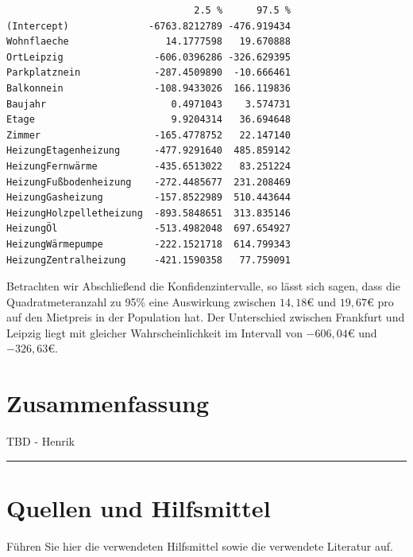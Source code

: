 \documentclass[
  a4paper,
  DIV=11]{scrartcl}
\begin{document}
\begin{verbatim}
                                 2.5 %      97.5 %
(Intercept)              -6763.8212789 -476.919434
Wohnflaeche                 14.1777598   19.670888
OrtLeipzig                -606.0396286 -326.629395
Parkplatznein             -287.4509890  -10.666461
Balkonnein                -108.9433026  166.119836
Baujahr                      0.4971043    3.574731
Etage                        9.9204314   36.694648
Zimmer                    -165.4778752   22.147140
HeizungEtagenheizung      -477.9291640  485.859142
HeizungFernwärme          -435.6513022   83.251224
HeizungFußbodenheizung    -272.4485677  231.208469
HeizungGasheizung         -157.8522989  510.443644
HeizungHolzpelletheizung  -893.5848651  313.835146
HeizungÖl                 -513.4982048  697.654927
HeizungWärmepumpe         -222.1521718  614.799343
HeizungZentralheizung     -421.1590358   77.759091
\end{verbatim}

Betrachten wir Abschließend die Konfidenzintervalle, so lässt sich
sagen, dass die Quadratmeteranzahl zu 95\% eine Auswirkung zwischen
\(14,18€\) und \(19,67€\) pro auf den Mietpreis in der Population hat.
Der Unterschied zwischen Frankfurt und Leipzig liegt mit gleicher
Wahrscheinlichkeit im Intervall von \(-606,04€\) und \(-326,63€\).

\hypertarget{zusammenfassung}{%
\section{Zusammenfassung}\label{zusammenfassung}}

TBD - Henrik

\begin{center}\rule{0.5\linewidth}{0.5pt}\end{center}

\hypertarget{quellen-und-hilfsmittel}{%
\section{Quellen und Hilfsmittel}\label{quellen-und-hilfsmittel}}

Führen Sie hier die verwendeten Hilfsmittel sowie die verwendete
Literatur auf.
\end{document}
